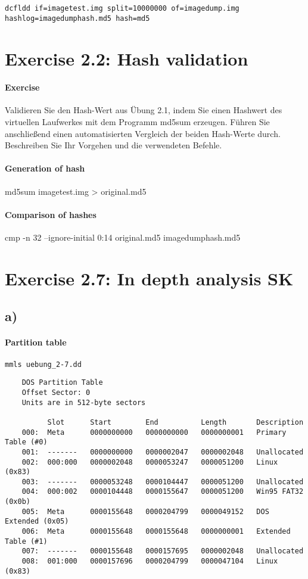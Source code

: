 \documentclass[10pt,a4paper]{article}
\begin{document}
\Verb+dcfldd if=imagetest.img split=10000000 of=imagedump.img hashlog=imagedumphash.md5 hash=md5+

\section{Exercise 2.2: Hash validation}

\paragraph{Exercise}
Validieren Sie den Hash-Wert aus Übung 2.1, indem Sie einen Hashwert des virtuellen Laufwerkes mit dem Programm
md5sum erzeugen. Führen Sie anschließend einen automatisierten Vergleich der beiden Hash-Werte durch. Beschreiben
Sie Ihr Vorgehen und die verwendeten Befehle.

\paragraph{Generation of hash}
md5sum imagetest.img > original.md5

\paragraph{Comparison of hashes}
cmp -n 32 --ignore-initial 0:14 original.md5 imagedumphash.md5




\section{Exercise 2.7: In depth analysis SK}
\subsection{a)}
\paragraph{Partition table}
\Verb+mmls uebung_2-7.dd+
\begin{lstlisting}
    DOS Partition Table
    Offset Sector: 0
    Units are in 512-byte sectors
    
          Slot      Start        End          Length       Description
    000:  Meta      0000000000   0000000000   0000000001   Primary Table (#0)
    001:  -------   0000000000   0000002047   0000002048   Unallocated
    002:  000:000   0000002048   0000053247   0000051200   Linux (0x83)
    003:  -------   0000053248   0000104447   0000051200   Unallocated
    004:  000:002   0000104448   0000155647   0000051200   Win95 FAT32 (0x0b)
    005:  Meta      0000155648   0000204799   0000049152   DOS Extended (0x05)
    006:  Meta      0000155648   0000155648   0000000001   Extended Table (#1)
    007:  -------   0000155648   0000157695   0000002048   Unallocated
    008:  001:000   0000157696   0000204799   0000047104   Linux (0x83)
\end{lstlisting}
\end{document}
